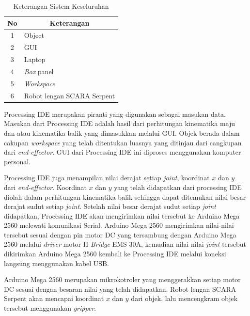 \begin{table}[H]
	\centering
	\caption{Keterangan Sistem Keseluruhan}
	\label{tbl.sistemkeseluruhan}
	\begin{tabular}{|c|l|}
		\hline
		\rowcolor[HTML]{9B9B9B} 
		No & \multicolumn{1}{c|}{\cellcolor[HTML]{9B9B9B}Keterangan} \\ \hline
		1  & Object                                    \\ \hline
		2  & GUI                                              \\ \hline
		3  & Laptop                                        \\ \hline
		4  & \textit{Box} panel                                       \\ \hline
		5  & \textit{Workspace} \\ \hline
		6  & Robot lengan SCARA Serpent	                                    \\ \hline
		
	\end{tabular}
	
\end{table}
Processing IDE merupakan piranti yang digunakan sebagai masukan data. Masukan dari Processing IDE adalah hasil dari perhitungan kinematika maju dan atau kinematika balik yang dimasukkan melalui GUI. Objek berada dalam cakupan \textit{workspace} yang telah ditentukan luasnya yang ditinjau dari cangkupan dari \textit{end-effector}. GUI dari Processing IDE ini diproses menggunakan komputer personal.  

Processing IDE juga menampilan nilai derajat setiap \textit{joint}, koordinat $x$ dan $y$ dari \textit{end-effector}. Koordinat $x$ dan $y$ yang telah didapatkan dari processing IDE diolah dalam perhitungan kinematika balik sehingga dapat ditemukan nilai besar derajat sudut setiap \textit{joint}. Setelah nilai besar derajat sudut setiap \textit{joint} didapatkan, Processing IDE akan mengirimkan nilai tersebut ke Arduino Mega 2560 melewati komunikasi Serial. Arduino Mega 2560 mengirimkan nilai-nilai tersebut sesuai dengan pin motor DC yang tersambung dengan Arduino Mega 2560 melalui \textit{driver} motor H-\textit{Bridge} EMS 30A, kemudian nilai-nilai \textit{joint}  tersebut dikirimkan Arduino Mega 2560 kembali ke Processing IDE melalui koneksi langsung menggunakan kabel USB.  

Arduino Mega 2560 merupakan mikrokotroler yang menggerakkan setiap motor DC sesuai dengan besaran nilai yang telah didapatkan. Robot lengan SCARA Serpent akan mencapai koordinat $x$ dan $y$ dari objek, lalu mencengkram objek tersebut menggunakan \textit{gripper}.
